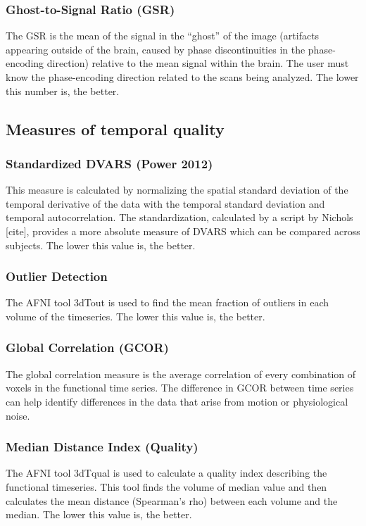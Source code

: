 \documentclass{frontiersSCNS} %
\begin{document}
\subsubsection{Ghost-to-Signal Ratio (GSR)}
\label{sec:10}
The GSR is the mean of the signal in the “ghost” of the image (artifacts appearing outside of the brain, caused by phase discontinuities in the phase-encoding direction) relative to the mean signal within the brain. The user must know the phase-encoding direction related to the scans being analyzed. The lower this number is, the better.
\subsection{Measures of temporal quality}
\label{sec:11}
\subsubsection{Standardized DVARS (Power 2012)}
\label{sec:12}
This measure is calculated by normalizing the spatial standard deviation of the temporal derivative of the data with the temporal standard deviation and temporal autocorrelation. The standardization, calculated by a script by Nichols [cite], provides a more absolute measure of DVARS which can be compared across subjects. The lower this value is, the better.
\subsubsection{Outlier Detection}
\label{sec:13}
The AFNI tool 3dTout is used to find the mean fraction of outliers in each volume of the timeseries. The lower this value is, the better.
\subsubsection{Global Correlation (GCOR)}
\label{sec:14}
The global correlation measure is the average correlation of every combination of voxels in the functional time series. The difference in GCOR between time series can help identify differences in the data that arise from motion or physiological noise.
\subsubsection{Median Distance Index (Quality)}
\label{sec:15}
The AFNI tool 3dTqual is used to calculate a quality index describing the functional timeseries. This tool finds the volume of median value and then calculates the mean distance (Spearman’s rho) between each volume and the median. The lower this value is, the better.
\end{document}
